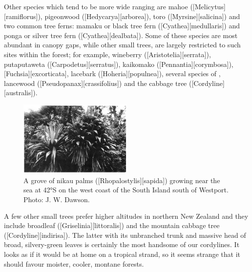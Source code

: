 Other species which tend to be more wide ranging are mahoe ([Melicytus][ramiflorus]), pigeonwood ([Hedycarya][arborea]), toro ([Myrsine][salicina]) and two common tree ferns: mamaku or black tree fern ([Cyathea][medullaris]) and ponga or silver tree fern ([Cyathea][dealbata]).
Some of these species are most abundant in canopy gaps, while other small trees, are largely restricted to such sites within the forest; for example, wineberry ([Aristotelia][serrata]), putaputaweta ([Carpodetus][serratus]), kaikomako ([Pennantia][corymbosa]),  [Fuchsia][excorticata], lacebark ([Hoheria][populnea]), several species of , lancewood ([Pseudopanax][crassifolius]) and the cabbage tree ([Cordyline][australis]).

\begin{figure}
	\includegraphics[width=0.5\textwidth]{graphics/figure61cabbagetree.jpg}
	\centering
	\caption[A grove of nikau palms]{A grove of nikau palms ([Rhopalostylis][sapida]) growing near the sea at 42°S on the west coast of the South Island south of Westport. Photo:  J. W. Dawson.}%
	\label{fig:61cabbagetree}
\end{figure}

A few other small trees prefer higher altitudes in northern New Zealand and they include broadleaf ([Griselinia][littoralis]) and the mountain cabbage tree ([Cordyline][indirisa]).
The latter with its unbranched trunk and massive head of broad, silvery-green leaves is certainly the most handsome of our cordylines.
It looks as if it would be at home on a tropical strand, so it seems strange that it should favour moister, cooler, montane forests.

